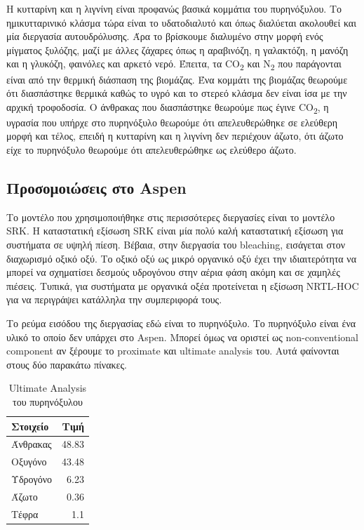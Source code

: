 \documentclass[11pt]{article}
\begin{document}
Η κυτταρίνη και η λιγνίνη είναι προφανώς βασικά κομμάτια του πυρηνόξυλου. Το ημικυτταρινικό κλάσμα τώρα είναι το υδατοδιαλυτό και όπως διαλύεται ακολουθεί και μία διεργασία αυτουδρόλυσης. Άρα το βρίσκουμε διαλυμένο στην μορφή ενός μίγματος ξυλόζης, μαζί με άλλες ζάχαρες όπως η αραβινόζη, η γαλακτόζη, η μανόζη και η γλυκόζη, φαινόλες και αρκετό νερό. Έπειτα, τα CO\textsubscript{2} και N\textsubscript{2} που παράγονται είναι από την θερμική διάσπαση της βιομάζας. Ένα κομμάτι της βιομάζας θεωρούμε ότι διασπάστηκε θερμικά καθώς το υγρό και το στερεό κλάσμα δεν είναι ίσα με την αρχική τροφοδοσία. Ο άνθρακας που διασπάστηκε θεωρούμε πως έγινε CO\textsubscript{2}, η υγρασία που υπήρχε στο πυρηνόξυλο θεωρούμε ότι απελευθερώθηκε σε ελεύθερη μορφή και τέλος, επειδή η κυτταρίνη και η λιγνίνη δεν περιέχουν άζωτο, ότι άζωτο είχε το πυρηνόξυλο θεωρούμε ότι απελευθερώθηκε ως ελεύθερο άζωτο.

\subsection{Προσομοιώσεις στο Aspen}
\label{sec:orgf171c28}
Το μοντέλο που χρησιμοποιήθηκε στις περισσότερες διεργασίες είναι το μοντέλο SRK. Η καταστατική εξίσωση SRK είναι μία πολύ καλή καταστατική εξίσωση για συστήματα σε υψηλή πίεση. Βέβαια, στην διεργασία του bleaching, εισάγεται στον διαχωρισμό οξικό οξύ. Το οξικό οξύ ως μικρό οργανικό οξύ έχει την ιδιαιτερότητα να μπορεί να σχηματίσει δεσμούς υδρογόνου στην αέρια φάση ακόμη και σε χαμηλές πιέσεις. Τυπικά, για συστήματα με οργανικά οξέα προτείνεται η εξίσωση NRTL-HOC για να περιγράψει κατάλληλα την συμπεριφορά τους.

Το ρεύμα εισόδου της διεργασίας εδώ είναι το πυρηνόξυλο. Το πυρηνόξυλο είναι ένα υλικό το οποίο δεν υπάρχει στο Aspen. Μπορεί όμως να οριστεί ως non-conventional component αν ξέρουμε το proximate και ultimate analysis του. Αυτά φαίνονται στους δύο παρακάτω πίνακες.

\begin{table}[htbp]
\caption{Ultimate Analysis του πυρηνόξυλου}
\centering
\begin{tabular}{lr}
Στοιχείο & Τιμή\\
\hline
Άνθρακας & 48.83\\
Οξυγόνο & 43.48\\
Υδρογόνο & 6.23\\
Άζωτο & 0.36\\
Τέφρα & 1.1\\
\end{tabular}
\end{table}
\end{document}
